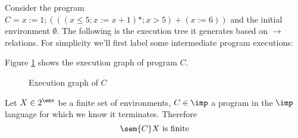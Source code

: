 \begin{example}
  Consider the program \(C = x := 1; (((x\leq 5; x := x + 1)*;x>5) +
  (x := 6))\) and the initial environment \(\emptyset\). The following
  is the execution tree it generates based on \(\to\) relations. For
  simplicity we'll first label some intermediate program executions:

  Figure \ref{fig:exec} shows the execution graph of program \(C\).
  
  \begin{figure}
    \centering
    \usetikzlibrary{positioning}
    \usetikzlibrary{graphs}
    \caption{Execution graph of \(C\)}\label{fig:exec}
  \end{figure}
\end{example}

\begin{lemma}
  Let \(X \in 2^\env\) be a finite set of environments, \(C \in \imp\)
  a program in the \(\imp\) language for which we know it
  terminates. Therefore \[\sem{C}X \text{ is finite}\]
\end{lemma}


